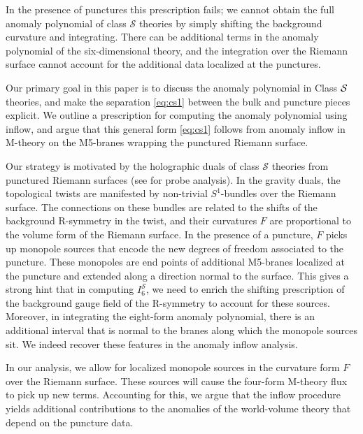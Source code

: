 \documentclass[a4paper,11pt]{article}
\def\CS{{\cal S}}
\begin{document}
In the presence of punctures this prescription fails; we cannot obtain the full anomaly polynomial of class $\mathcal{S}$ theories by simply shifting the background curvature and integrating.  There can be additional terms in the anomaly polynomial of the six-dimensional theory, and the integration over the Riemann surface cannot account for the additional data localized at the punctures.  
 
 Our primary goal in this paper is to discuss the anomaly polynomial in Class $\CS$ theories, and make the separation \eqref{eq:cs1} between the bulk and puncture pieces explicit. We outline a prescription for computing the anomaly polynomial using inflow, and argue that this general form \eqref{eq:cs1} follows from anomaly inflow in M-theory on the M5-branes wrapping the punctured Riemann surface. %
 
 Our strategy is motivated by the holographic duals of class $\mathcal{S}$ theories from punctured Riemann surfaces \cite{Gaiotto:2009gz,Bah:2015fwa} (see \cite{Bah:2013wda} for probe analysis).  In the gravity duals, the topological twists are manifested by non-trivial $S^1$-bundles over the Riemann surface.  The connections on these bundles are related to the shifts of the background R-symmetry in the twist, and their curvatures $F$ are proportional to the volume form of the Riemann surface.  In the presence of a puncture, $F$ picks up monopole sources that encode the new degrees of freedom associated to the puncture.  These monopoles are end points of additional M5-branes localized at the puncture and extended along a direction normal to the surface.  This gives a strong hint that in computing $I_6^\mathcal{S}$, we need to enrich the shifting prescription of the background gauge field of the R-symmetry to account for these sources.  Moreover, in integrating the eight-form anomaly polynomial, there is an additional interval that is normal to the branes along which the monopole sources sit.  We indeed recover these features in the anomaly inflow analysis.     
 
 
 In our analysis, we allow for localized monopole sources in the curvature form $F$ over the Riemann surface. These sources will cause the four-form M-theory flux  to pick up new terms. Accounting for this, we argue that the inflow procedure yields additional contributions to the anomalies of the world-volume theory that depend on the puncture data. 
 
 


\end{document}
